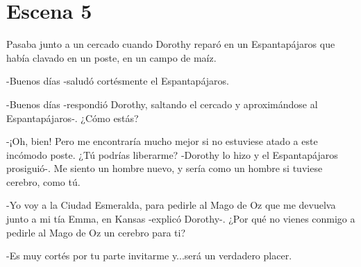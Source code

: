 \chapter{Escena 5}
Pasaba junto a un cercado cuando Dorothy reparó en un Espantapájaros que había clavado en un poste, en un campo de maíz.

-Buenos días -saludó cortésmente el Espantapájaros.

-Buenos días -respondió Dorothy, saltando el cercado y aproximándose al Espantapájaros-. ¿Cómo estás?

-¡Oh, bien! Pero me encontraría mucho mejor si no estuviese atado a este incómodo poste. ¿Tú podrías liberarme? -Dorothy lo hizo y el Espantapájaros prosiguió-. Me siento un hombre nuevo, y sería como un hombre si tuviese cerebro, como tú.

-Yo voy a la Ciudad Esmeralda, para pedirle al Mago de Oz que me devuelva junto a mi tía Emma, en Kansas -explicó Dorothy-. ¿Por qué no vienes conmigo a pedirle al Mago de Oz un cerebro para ti?

-Es muy cortés por tu parte invitarme y...será un verdadero placer.